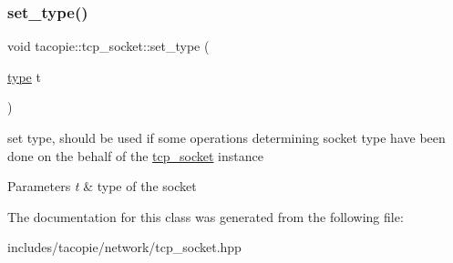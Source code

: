 \subsubsection{\texorpdfstring{set\+\_\+type()}{set\_type()}}
{\footnotesize\ttfamily void tacopie\+::tcp\+\_\+socket\+::set\+\_\+type (\begin{DoxyParamCaption}\item[{\hyperlink{classtacopie_1_1tcp__socket_ad8376e85df96ab9523f5d079ed7172ab}{type}}]{t }\end{DoxyParamCaption})}

set type, should be used if some operations determining socket type have been done on the behalf of the \hyperlink{classtacopie_1_1tcp__socket}{tcp\+\_\+socket} instance


\begin{DoxyParams}{Parameters}
{\em t} & type of the socket \\
\hline
\end{DoxyParams}


The documentation for this class was generated from the following file\+:\begin{DoxyCompactItemize}
\item 
includes/tacopie/network/tcp\+\_\+socket.\+hpp\end{DoxyCompactItemize}
